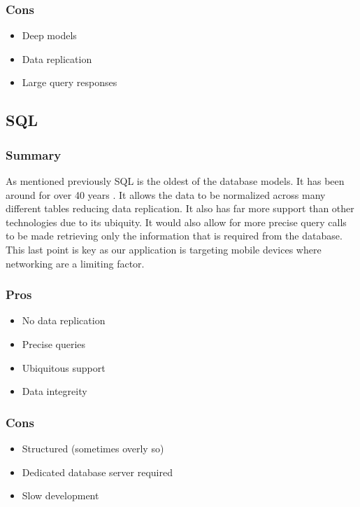         \subsubsection{Cons}
        
        \begin{itemize}
            \item Deep models
            \item Data replication
            \item Large query responses
        \end{itemize}
    
    \subsection{SQL}
    
        \subsubsection{Summary}
        
        As mentioned previously SQL is the oldest of the database models.  It has been around for over 40 years \cite{sqlizer}.  It allows the data to be normalized across many different tables reducing data replication.  It also has far more support than other technologies due to its ubiquity.  It would also allow for more precise query calls to be made retrieving only the information that is required from the database.  This last point is key as our application is targeting mobile devices where networking are a limiting factor.
        
        \subsubsection{Pros}
        \begin{itemize}
            \item No data replication
            \item Precise queries
            \item Ubiquitous support
            \item Data integreity
        \end{itemize}
        
        \subsubsection{Cons}
        \begin{itemize}
            \item Structured (sometimes overly so)
            \item Dedicated database server required
            \item Slow development
        \end{itemize}
    
